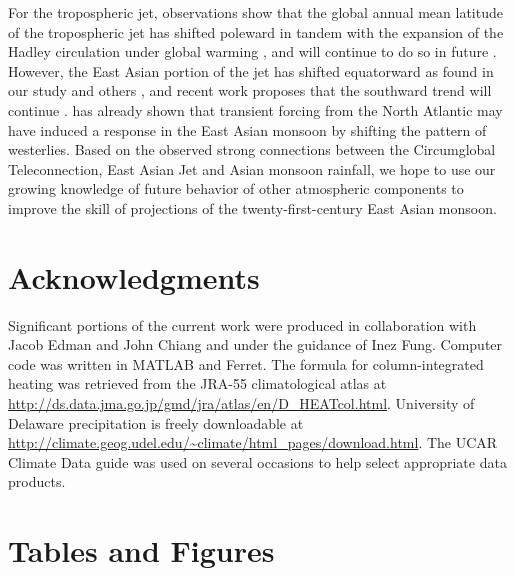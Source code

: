 	 For the tropospheric jet, observations show that the global annual mean latitude of the tropospheric jet has shifted poleward in tandem with the expansion of the Hadley circulation under global warming \citep{Fu2006,Archer2008,Fu2011}, and will continue to do so in future \citep{Lu2007,Kang2012}. However, the East Asian portion of the jet has shifted equatorward as found in our study and others \citep{Yu2007, Archer2008,Park2014a}, and recent work proposes that the southward trend will continue \citep{Park2014}. \citet{Liu2012} has already shown that transient forcing from the North Atlantic may have induced a response in the East Asian monsoon by shifting the pattern of westerlies. Based on the observed strong connections between the Circumglobal Teleconnection, East Asian Jet and Asian monsoon rainfall, we hope to use our growing knowledge of future behavior of other atmospheric components to improve the skill of projections of the twenty-first-century East Asian monsoon.

\section{Acknowledgments}

	Significant portions of the current work were produced in collaboration with Jacob Edman and John Chiang and under the guidance of Inez Fung. Computer code was written in MATLAB and Ferret. The formula for column-integrated heating was retrieved from the JRA-55 climatological atlas at \url{http://ds.data.jma.go.jp/gmd/jra/atlas/en/D_HEATcol.html}. University of Delaware precipitation is freely downloadable at \url{http://climate.geog.udel.edu/~climate/html_pages/download.html}. The UCAR Climate Data guide was used on several occasions to help select appropriate data products.

\clearpage
\newpage	
\section{Tables and Figures}



